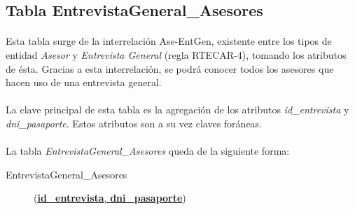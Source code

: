    \subsection{Tabla EntrevistaGeneral\_Asesores}

      \paragraph{}Esta tabla surge de la interrelación Ase-EntGen, existente
      entre los tipos de entidad \textit{Asesor} y \textit{Entrevista General}
      (regla RTECAR-4), tomando los atributos de ésta. Gracias a esta
      interrelación, se podrá conocer todos los asesores que hacen uso de una
      entrevista general.

      \paragraph{}La clave principal de esta tabla es la agregación de los
      atributos \textit{id\_entrevista} y \textit{dni\_pasaporte}. Estos
      atributos son a su vez claves foráneas.

      \paragraph{}La tabla
      \textit{EntrevistaGeneral\_Asesores} queda de la siguiente forma:

      \begin{description}
         \item[EntrevistaGeneral\_Asesores] \begin{flushleft}(\underline{\textbf{id\_entrevista},
         \textbf{dni\_pasaporte}})\end{flushleft}
      \end{description}